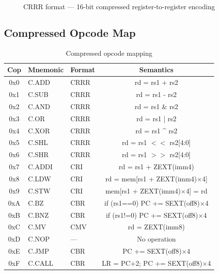 \documentclass[11pt,a4paper]{article}
\begin{document}
\begin{figure}[H]
\centering
{}
\caption{CRRR format --- 16-bit compressed register-to-register encoding}
\end{figure}

\subsection{Compressed Opcode Map}

\begin{table}[H]
\centering
\caption{Compressed opcode mapping}
\begin{tabular}{cllc}
\toprule
Cop & Mnemonic & Format & Semantics \\
\midrule
0x0 & C.ADD  & CRRR & rd = rs1 + rs2 \\
0x1 & C.SUB  & CRRR & rd = rs1 - rs2 \\
0x2 & C.AND  & CRRR & rd = rs1 \& rs2 \\
0x3 & C.OR   & CRRR & rd = rs1 | rs2 \\
0x4 & C.XOR  & CRRR & rd = rs1 \^{} rs2 \\
0x5 & C.SHL  & CRRR & rd = rs1 $<<$ rs2[4:0] \\
0x6 & C.SHR  & CRRR & rd = rs1 $>>$ rs2[4:0] \\
0x7 & C.ADDI & CRI  & rd = rs1 + ZEXT(imm4) \\
0x8 & C.LDW  & CRI  & rd = mem[rs1 + ZEXT(imm4)$\times$4] \\
0x9 & C.STW  & CRI  & mem[rs1 + ZEXT(imm4)$\times$4] = rd \\
0xA & C.BZ   & CBR  & if (rs1==0) PC += SEXT(off8)$\times$4 \\
0xB & C.BNZ  & CBR  & if (rs1!=0) PC += SEXT(off8)$\times$4 \\
0xC & C.MV   & CMV  & rd = ZEXT(imm8) \\
0xD & C.NOP  & ---  & No operation \\
0xE & C.JMP  & CBR  & PC += SEXT(off8)$\times$4 \\
0xF & C.CALL & CBR  & LR = PC+2; PC += SEXT(off8)$\times$4 \\
\bottomrule
\end{tabular}
\end{table}
\end{document}
